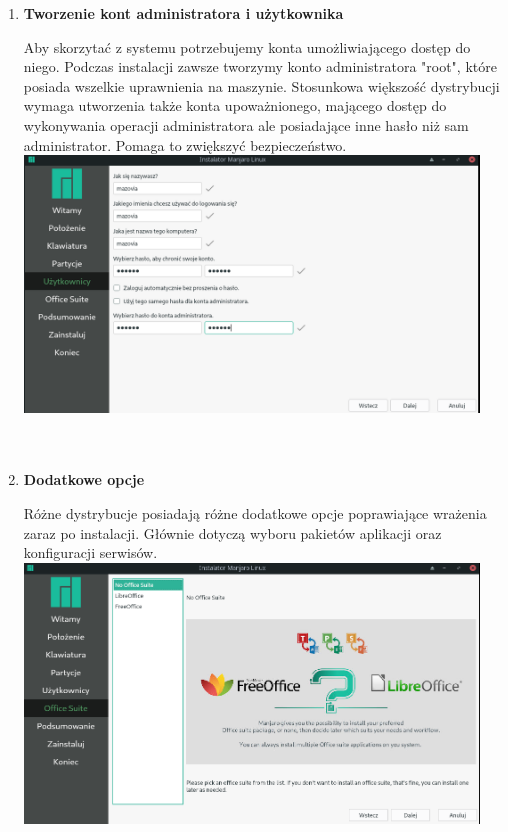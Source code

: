 \documentclass[10pt,a4paper]{article}
\begin{document}
\begin{enumerate}
\item \textbf{Tworzenie kont administratora i użytkownika} \par
Aby skorzytać z systemu potrzebujemy konta umożliwiającego dostęp do niego. Podczas instalacji zawsze tworzymy konto administratora "root", które posiada wszelkie uprawnienia na maszynie. Stosunkowa większość dystrybucji wymaga utworzenia także konta upoważnionego, mającego dostęp do wykonywania operacji administratora ale posiadające inne hasło niż sam administrator. Pomaga to zwiększyć bezpieczeństwo.\\

\includegraphics[width=0.95\textwidth, center]{manjaro_install7.png}\\\\\\

\item \textbf{Dodatkowe opcje} \par
Różne dystrybucje posiadają różne dodatkowe opcje poprawiające wrażenia zaraz po instalacji. Głównie dotyczą wyboru pakietów aplikacji oraz konfiguracji serwisów.\\

\includegraphics[width=0.95\textwidth, center]{manjaro_install8.png}\\\\\\





\end{enumerate}
\end{document}
